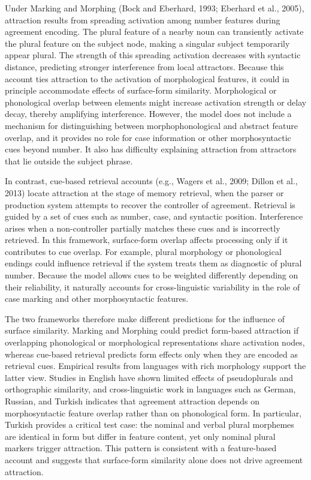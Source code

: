 \documentclass[
  authoryear,
  preprint]{elsarticle}
\begin{document}
Under Marking and Morphing (Bock and Eberhard, 1993; Eberhard et al.,
2005), attraction results from spreading activation among number
features during agreement encoding. The plural feature of a nearby noun
can transiently activate the plural feature on the subject node, making
a singular subject temporarily appear plural. The strength of this
spreading activation decreases with syntactic distance, predicting
stronger interference from local attractors. Because this account ties
attraction to the activation of morphological features, it could in
principle accommodate effects of surface-form similarity. Morphological
or phonological overlap between elements might increase activation
strength or delay decay, thereby amplifying interference. However, the
model does not include a mechanism for distinguishing between
morphophonological and abstract feature overlap, and it provides no role
for case information or other morphosyntactic cues beyond number. It
also has difficulty explaining attraction from attractors that lie
outside the subject phrase.

In contrast, cue-based retrieval accounts (e.g., Wagers et al., 2009;
Dillon et al., 2013) locate attraction at the stage of memory retrieval,
when the parser or production system attempts to recover the controller
of agreement. Retrieval is guided by a set of cues such as number, case,
and syntactic position. Interference arises when a non-controller
partially matches these cues and is incorrectly retrieved. In this
framework, surface-form overlap affects processing only if it
contributes to cue overlap. For example, plural morphology or
phonological endings could influence retrieval if the system treats them
as diagnostic of plural number. Because the model allows cues to be
weighted differently depending on their reliability, it naturally
accounts for cross-linguistic variability in the role of case marking
and other morphosyntactic features.

The two frameworks therefore make different predictions for the
influence of surface similarity. Marking and Morphing could predict
form-based attraction if overlapping phonological or morphological
representations share activation nodes, whereas cue-based retrieval
predicts form effects only when they are encoded as retrieval cues.
Empirical results from languages with rich morphology support the latter
view. Studies in English have shown limited effects of pseudoplurals and
orthographic similarity, and cross-linguistic work in languages such as
German, Russian, and Turkish indicates that agreement attraction depends
on morphosyntactic feature overlap rather than on phonological form. In
particular, Turkish provides a critical test case: the nominal and
verbal plural morphemes are identical in form but differ in feature
content, yet only nominal plural markers trigger attraction. This
pattern is consistent with a feature-based account and suggests that
surface-form similarity alone does not drive agreement attraction.
\end{document}
